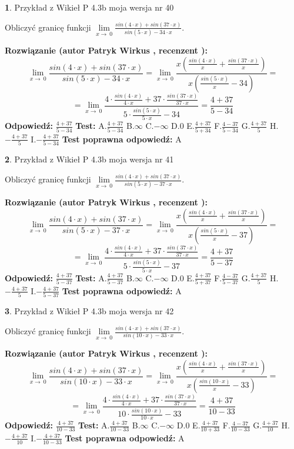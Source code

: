 \documentclass[12pt, a4paper]{article}
\theoremstyle{definition} %
\newtheorem{zad}{}
\newcommand{\zadStart}[1]{\begin{zad}#1\newline}
\newcommand{\zadStop}{\end{zad}}
\newcommand{\rozwStart}[2]{\noindent \textbf{Rozwiązanie (autor #1 , recenzent #2): }\newline}
\newcommand{\rozwStop}{\newline}
\newcommand{\odpStart}{\noindent \textbf{Odpowiedź:}\newline}
\newcommand{\odpStop}{\newline}
\newcommand{\testStart}{\noindent \textbf{Test:}\newline}
\newcommand{\testStop}{\newline}
\newcommand{\kluczStart}{\noindent \textbf{Test poprawna odpowiedź:}\newline}
\newcommand{\kluczStop}{\newline}
\begin{document}
\zadStart{Przykład z Wikieł P 4.3b moja wersja nr 40}


Obliczyć granicę funkcji $\lim\limits_{x\to\ 0}\frac{sin(4 \cdot x)+sin(37 \cdot x)}{sin(5 \cdot x)-34 \cdot x}$.
\zadStop
\rozwStart{Patryk Wirkus}{}
$$\lim\limits_{x\to\ 0}\frac{sin(4 \cdot x)+sin(37 \cdot x)}{sin(5 \cdot x)-34 \cdot x}=\lim\limits_{x\to\ 0}\frac{x(\frac{sin(4 \cdot x)}{x}+\frac{sin(37 \cdot x)}{x})}{x(\frac{sin(5 \cdot x)}{x}-34)}=$$
$$=\lim\limits_{x\to\ 0}\frac{4 \cdot \frac{sin(4 \cdot x)}{4 \cdot x}+37 \cdot \frac{sin(37 \cdot x)}{37 \cdot x}}{5 \cdot \frac{sin(5 \cdot x)}{5 \cdot x}-34}=\frac{4+37}{5-34}$$
\rozwStop
\odpStart
$\frac{4+37}{5-34}$
\odpStop
\testStart
A.$\frac{4+37}{5-34}$
B.$\infty$
C.$-\infty$
D.$0$
E.$\frac{4+37}{5+34}$
F.$\frac{4-37}{5-34}$
G.$\frac{4+37}{5}$
H.$-\frac{4+37}{5}$
I.$-\frac{4+37}{5-34}$
\testStop
\kluczStart
A
\kluczStop



\zadStart{Przykład z Wikieł P 4.3b moja wersja nr 41}


Obliczyć granicę funkcji $\lim\limits_{x\to\ 0}\frac{sin(4 \cdot x)+sin(37 \cdot x)}{sin(5 \cdot x)-37 \cdot x}$.
\zadStop
\rozwStart{Patryk Wirkus}{}
$$\lim\limits_{x\to\ 0}\frac{sin(4 \cdot x)+sin(37 \cdot x)}{sin(5 \cdot x)-37 \cdot x}=\lim\limits_{x\to\ 0}\frac{x(\frac{sin(4 \cdot x)}{x}+\frac{sin(37 \cdot x)}{x})}{x(\frac{sin(5 \cdot x)}{x}-37)}=$$
$$=\lim\limits_{x\to\ 0}\frac{4 \cdot \frac{sin(4 \cdot x)}{4 \cdot x}+37 \cdot \frac{sin(37 \cdot x)}{37 \cdot x}}{5 \cdot \frac{sin(5 \cdot x)}{5 \cdot x}-37}=\frac{4+37}{5-37}$$
\rozwStop
\odpStart
$\frac{4+37}{5-37}$
\odpStop
\testStart
A.$\frac{4+37}{5-37}$
B.$\infty$
C.$-\infty$
D.$0$
E.$\frac{4+37}{5+37}$
F.$\frac{4-37}{5-37}$
G.$\frac{4+37}{5}$
H.$-\frac{4+37}{5}$
I.$-\frac{4+37}{5-37}$
\testStop
\kluczStart
A
\kluczStop



\zadStart{Przykład z Wikieł P 4.3b moja wersja nr 42}


Obliczyć granicę funkcji $\lim\limits_{x\to\ 0}\frac{sin(4 \cdot x)+sin(37 \cdot x)}{sin(10 \cdot x)-33 \cdot x}$.
\zadStop
\rozwStart{Patryk Wirkus}{}
$$\lim\limits_{x\to\ 0}\frac{sin(4 \cdot x)+sin(37 \cdot x)}{sin(10 \cdot x)-33 \cdot x}=\lim\limits_{x\to\ 0}\frac{x(\frac{sin(4 \cdot x)}{x}+\frac{sin(37 \cdot x)}{x})}{x(\frac{sin(10 \cdot x)}{x}-33)}=$$
$$=\lim\limits_{x\to\ 0}\frac{4 \cdot \frac{sin(4 \cdot x)}{4 \cdot x}+37 \cdot \frac{sin(37 \cdot x)}{37 \cdot x}}{10 \cdot \frac{sin(10 \cdot x)}{10 \cdot x}-33}=\frac{4+37}{10-33}$$
\rozwStop
\odpStart
$\frac{4+37}{10-33}$
\odpStop
\testStart
A.$\frac{4+37}{10-33}$
B.$\infty$
C.$-\infty$
D.$0$
E.$\frac{4+37}{10+33}$
F.$\frac{4-37}{10-33}$
G.$\frac{4+37}{10}$
H.$-\frac{4+37}{10}$
I.$-\frac{4+37}{10-33}$
\testStop
\kluczStart
A
\kluczStop
\end{document}
